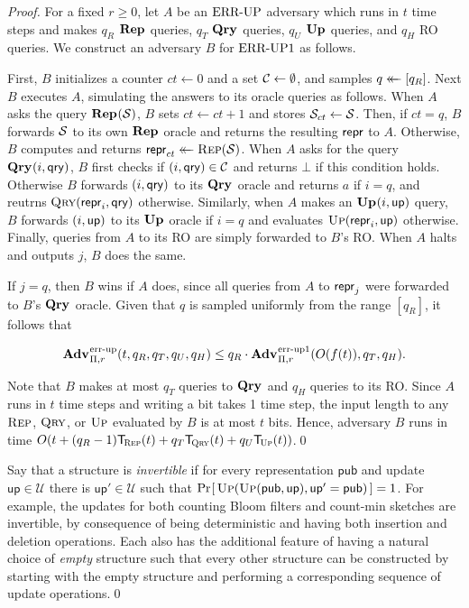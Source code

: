 \begin{proof}For a fixed $r \ge 0$, let $A$ be an $\textnormal{ERR\mbox{-}UP}$ adversary which runs in $t$ time steps and makes $q_R$ $\mathbf{Rep}\hspace{0.5pt}$ queries, $q_T$ $\mathbf{Qry}\hspace{0.5pt}$ queries, $q_U$ $\mathbf{Up}\hspace{0.5pt}$ queries, and $q_H$ RO queries. We construct an adversary $B$ for $\textnormal{ERR\mbox{-}UP}1$ as follows.

First, $B$ initializes a counter $ct \gets 0$ and a set $\mathcal{C} \gets \emptyset$, and samples $q \mathrel{\leftarrow\mkern-14mu\leftarrow} [q_R]$. Next $B$ executes $A$, simulating the answers to its oracle queries as follows. When $A$ asks the query $\mathbf{Rep}\hspace{0.5pt}(\mathcal{S})$, $B$ sets $ct \gets ct + 1$ and stores $\mathcal{S}_{ct} \gets \mathcal{S}$. Then, if $ct = q$, $B$ forwards $\mathcal{S}$ to its own $\mathbf{Rep}\hspace{0.5pt}$ oracle and returns the resulting $\mathsf{repr}$ to $A$. Otherwise, $B$ computes and returns $\mathsf{repr}_{ct} \mathrel{\leftarrow\mkern-14mu\leftarrow} \textsc{Rep}(\mathcal{S})$. When $A$ asks for the query $\mathbf{Qry}\hspace{0.5pt}(i,\mathsf{qry})$, $B$ first checks if $(i,\mathsf{qry}) \in \mathcal{C}$ and returns $\bot$ if this condition holds. Otherwise $B$ forwards $(i,\mathsf{qry})$ to its $\mathbf{Qry}\hspace{0.5pt}$ oracle and returns $a$ if $i = q$, and reutrns $\textsc{Qry}(\mathsf{repr}_i,\mathsf{qry})$ otherwise. Similarly, when $A$ makes an $\mathbf{Up}\hspace{0.5pt}(i,\mathsf{up})$ query, $B$ forwards $(i,\mathsf{up})$ to its $\mathbf{Up}\hspace{0.5pt}$ oracle if $i = q$ and evaluates $\textsc{Up}(\mathsf{repr}_i,\mathsf{up})$ otherwise. Finally, queries from $A$ to its RO are simply forwarded to $B$'s RO. When $A$ halts and outputs $j$, $B$ does the same.

If $j = q$, then $B$ wins if $A$ does, since all queries from $A$ to $\mathsf{repr}_j$ were forwarded to $B$'s $\mathbf{Qry}\hspace{0.5pt}$ oracle. Given that $q$ is sampled uniformly from the range $[q_R]$, it follows that

$$\Adv{\errep}_{\struct,r}(t, q_R, q_T, q_U, q_H) \leq q_R\cdot\Adv{\errep1}_{\struct,r}(O(f(t)), q_T, q_H).$$

Note that $B$ makes at most $q_T$ queries to $\mathbf{Qry}\hspace{0.5pt}$ and $q_H$ queries to its RO. Since $A$ runs in $t$ time steps and writing a bit takes 1 time step, the input length to any $\textsc{Rep}$, $\textsc{Qry}$, or $\textsc{Up}$ evaluated by $B$ is at most $t$ bits. Hence, adversary $B$ runs in time $O(t+(q_R-1)\ticks(\Rep,t)+q_T\ticks(\Qry,t)+q_U\ticks(\Up,t))$.\hfill\qed

Say that a structure is {\em invertible} if for every representation $\mathsf{pub}$ and update $\mathsf{up} \in \mathcal{U}$ there is $\mathsf{up}' \in \mathcal{U}$ such that $\Pr\hspace{-1pt}\left[\,\textsc{Up}(\textsc{Up}(\mathsf{pub},\mathsf{up}),\mathsf{up}' = \mathsf{pub})\,\right] = 1$.  For example, the updates for both counting Bloom filters and count-min sketches are invertible, by consequence of being deterministic and having both insertion and deletion operations. Each also has the additional feature of having a natural choice of {\em empty} structure such that every other structure can be constructed by starting with the empty structure and performing a corresponding sequence of update operations.\hfill\qed
\end{proof}

